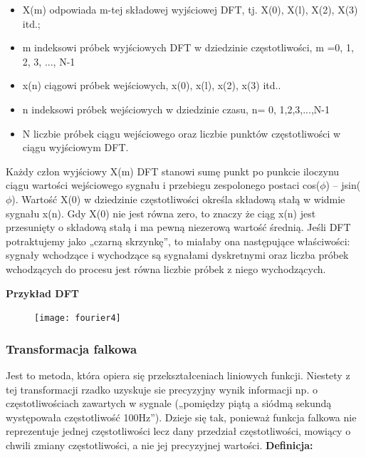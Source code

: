 \documentclass[a4paper,titleauthor]{mwart}
\begin{document}
	\begin{itemize}
		\item X(m)  odpowiada m-tej składowej wyjściowej DFT, tj. X(0), X(l), X(2), X(3) itd.;
		\item m  indeksowi próbek wyjściowych DFT w dziedzinie częstotliwości, m =0, 1, 2, 3, ..., N-1 
		\item x(n)  ciągowi próbek wejściowych, x(0), x(l), x(2), x(3) itd.. 
		\item n  indeksowi próbek wejściowych w dziedzinie czasu, n= 0, 1,2,3,...,N-1 
		\item N  liczbie próbek ciągu wejściowego oraz liczbie punktów częstotliwości w ciągu wyjściowym DFT.
	\end{itemize}
	Każdy człon wyjściowy X(m) DFT stanowi sumę punkt po punkcie iloczynu ciągu wartości wejściowego sygnału i przebiegu zespolonego postaci cos($\phi$) – jsin($\phi$).
	\newline\newline
	Wartość X(0) w dziedzinie częstotliwości określa składową stałą w widmie sygnału x(n). Gdy X(0) nie jest równa zero, to znaczy że ciąg x(n) jest przesunięty o składową stałą i ma pewną niezerową wartość średnią.
	\newline\newline
	Jeśli DFT potraktujemy jako „czarną skrzynkę”, to miałaby ona następujące właściwości: sygnały wchodzące i wychodzące są sygnałami dyskretnymi oraz liczba próbek wchodzących do procesu jest równa liczbie próbek z niego wychodzących.
	\newline\newline
	
	\textbf{Przykład DFT}
	\begin{figure}[ht]
		\centering
		\texttt{[image: fourier4]}
	\end{figure}
	
	\subsubsection{Transformacja falkowa}
	Jest to metoda, która opiera się przekształceniach liniowych funkcji. Niestety z tej transformacji rzadko uzyskuje sie precyzyjny wynik informacji np. o częstotliwościach zawartych w sygnale („pomiędzy piątą a siódmą sekundą występowała
	częstotliwość 100Hz”). Dzieje się tak, ponieważ funkcja falkowa nie reprezentuje jednej częstotliwości lecz dany przedział częstotliwości, mowiący o chwili zmiany częstotliwości, a nie jej precyzyjnej wartości.
	\newline \newline
	\textbf{Definicja:}\newline
	
\end{document}
